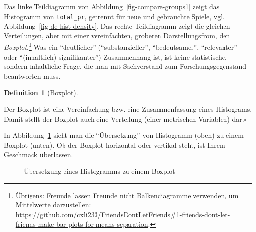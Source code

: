 \documentclass[
  letterpaper,
]{scrbook}
\theoremstyle{definition}
\theoremstyle{definition}
\newtheorem{definition}{Definition}[chapter]
\theoremstyle{definition}
\theoremstyle{remark}
\begin{document}
Das linke Teildiagramm von Abbildung~\ref{fig-compare-groups1} zeigt das
Histogramm von \texttt{total\_pr}, getrennt für neue und gebrauchte
Spiele, vgl. Abbildung~\ref{fig-de-hist-density}. Das rechte
Teildiagramm zeigt die gleichen Verteilungen, aber mit einer
vereinfachten, groberen Darstellungsfrom, den \emph{Boxplot}.\footnote{Übrigens:
  Freunde lassen Freunde nicht Balkendiagramme verwenden, um Mittelwerte
  darzustellen:
  \url{https://github.com/cxli233/FriendsDontLetFriends\#1-friends-dont-let-friends-make-bar-plots-for-means-separation}.}
Was ein ``deutlicher'' (``substanzieller'', ``bedeutsamer'',
``relevanter'' oder ``(inhaltlich) signifikanter'') Zusammenhang ist,
ist keine statistische, sondern inhaltliche Frage, die man mit
Sachverstand zum Forschungsgegenstand beantworten muss.

\begin{definition}[Boxplot]\protect\hypertarget{def-boxplot}{}\label{def-boxplot}

Der Boxplot ist eine Vereinfachung bzw. eine Zusammenfassung eines
Histograms. Damit stellt der Boxplot auch eine Verteilung (einer
metrischen Variablen) dar.\(\square\)

\end{definition}

In Abbildung~\ref{fig-hist-to-box} sieht man die ``Übersetzung'' von
Histogramm (oben) zu einem Boxplot (unten). Ob der Boxplot horizontal
oder vertikal steht, ist Ihrem Geschmack überlassen.

\begin{figure}


\caption{\label{fig-hist-to-box}Übersetzung eines Histogramms zu einem
Boxplot}

\end{figure}%
\end{document}
